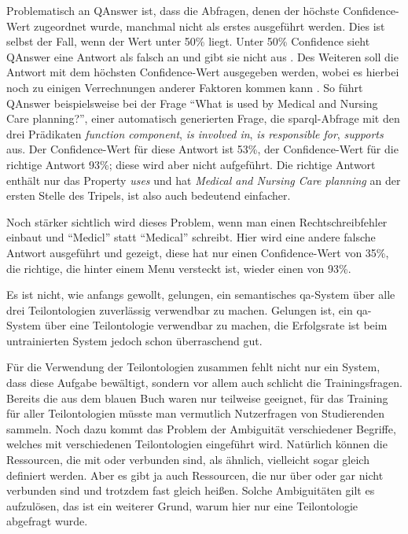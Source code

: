 Problematisch an QAnswer ist, dass die Abfragen, denen der höchste Confidence-Wert zugeordnet wurde, manchmal nicht als erstes ausgeführt werden.
Dies ist selbst der Fall, wenn der Wert unter 50\% liegt.
Unter 50\% Confidence sieht QAnswer eine Antwort als falsch an und gibt sie nicht aus \citep{qanswer}.
Des Weiteren soll die Antwort mit dem höchsten Confidence-Wert ausgegeben werden, wobei es hierbei noch zu einigen Verrechnungen anderer Faktoren kommen kann \citep{qanswerpatentapplication}.
So führt QAnswer beispielsweise bei der Frage \enquote{What is used by Medical and Nursing Care planning?},
einer automatisch generierten Frage, die \ac{sparql}-Abfrage mit den drei Prädikaten \emph{function component}, \emph{is involved in}, \emph{is responsible for}, \emph{supports} aus.
Der Confidence-Wert für diese Antwort ist 53\%, der Confidence-Wert für die richtige Antwort 93\%; diese wird aber nicht aufgeführt.
Die richtige Antwort enthält nur das Property \emph{uses} und hat \emph{Medical and Nursing Care planning} an der ersten Stelle des Tripels, ist also auch bedeutend einfacher.

Noch stärker sichtlich wird dieses Problem, wenn man einen Rechtschreibfehler einbaut und \enquote{Medicl} statt \enquote {Medical} schreibt.
Hier wird eine andere falsche Antwort ausgeführt und gezeigt, diese hat nur einen Confidence-Wert von 35\%, die richtige, die hinter einem Menu versteckt ist, wieder einen von 93\%.

Es ist nicht, wie anfangs gewollt, gelungen, ein semantisches \ac{qa}-System über alle drei Teilontologien zuverlässig verwendbar zu machen.
Gelungen ist, ein \ac{qa}-System über eine Teilontologie verwendbar zu machen, die Erfolgsrate ist beim untrainierten System jedoch schon überraschend gut.


Für die Verwendung der Teilontologien zusammen fehlt nicht nur ein System, dass diese Aufgabe bewältigt, sondern vor allem auch schlicht die Trainingsfragen.
Bereits die aus dem blauen Buch waren nur teilweise geeignet, für das Training für aller Teilontologien müsste man vermutlich Nutzerfragen von Studierenden sammeln.
Noch dazu kommt das Problem der Ambiguität verschiedener Begriffe, welches mit verschiedenen Teilontologien eingeführt wird.
Natürlich können die Ressourcen, die mit  oder  verbunden sind, als ähnlich, vielleicht sogar gleich definiert werden.
Aber es gibt ja auch Ressourcen, die nur über  oder gar nicht verbunden sind und trotzdem fast gleich heißen.
Solche Ambiguitäten gilt es aufzulösen, das ist ein weiterer Grund, warum hier nur eine Teilontologie abgefragt wurde.

